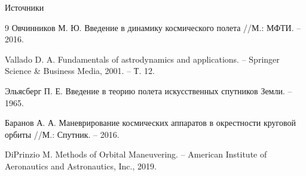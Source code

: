 \documentclass[9pt]{beamer}
\begin{document}
\begin{frame}[allowframebreaks]{Источники}
  \begin{thebibliography}{9}
    Овчинников М. Ю. Введение в динамику космического полета //М.: МФТИ. – 2016.

    Vallado D. A. Fundamentals of astrodynamics and applications. – Springer Science \& Business Media, 2001. – Т. 12.

    Эльясберг П. Е. Введение в теорию полета искусственных спутников Земли. – 1965.

    Баранов А. А. Маневрирование космических аппаратов в окрестности круговой орбиты //М.: Спутник. – 2016.

    DiPrinzio M. Methods of Orbital Maneuvering. – American Institute of Aeronautics and Astronautics, Inc., 2019.
    
  \end{thebibliography}
\end{frame}
\end{document}
